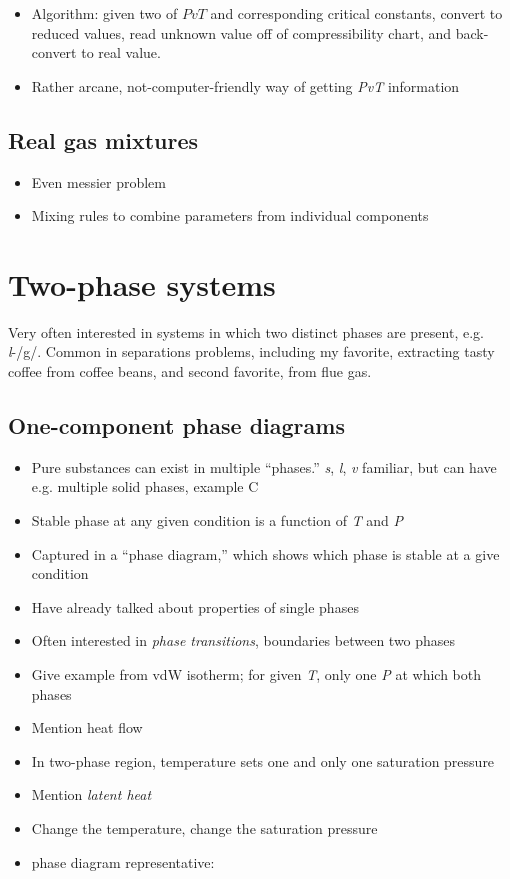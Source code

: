 \documentclass[11pt]{article}
\begin{document}
\begin{itemize}
\item Algorithm: given two of \(PvT\) and corresponding critical constants, convert to reduced values, read unknown value off of compressibility chart, and back-convert to real value.
\item Rather arcane, not-computer-friendly way of getting \emph{PvT} information
\end{itemize}

\subsection{Real gas mixtures}
\label{sec-7-5}
\begin{itemize}
\item Even messier problem
\item Mixing rules to combine parameters from individual components
\end{itemize}
\newpage

\section{Two-phase systems}
\label{sec-8}
Very often interested in systems in which two distinct phases are present, e.g. \emph{l}-/g/.  Common in separations problems, including my favorite, extracting tasty coffee from coffee beans, and second favorite,  from flue gas.

\subsection{One-component phase diagrams}
\label{sec-8-1}
\begin{itemize}
\item Pure substances can exist in multiple ``phases.''  \emph{s}, \emph{l}, \emph{v} familiar, but can have e.g. multiple solid phases, example C
\item Stable phase at any given condition is a function of \emph{T} and \emph{P}
\item Captured in a ``phase diagram,'' which shows which phase is stable at a give condition
\item Have already talked about properties of single phases
\item Often interested in \emph{phase transitions}, boundaries between two phases
\item Give example from vdW isotherm; for given \emph{T}, only one \emph{P} at which both phases
\item Mention heat flow
\item In two-phase region, temperature sets one and only one saturation pressure
\item Mention \emph{latent heat}
\item Change the temperature, change the saturation pressure

\item {} phase diagram representative:
\end{itemize}
\end{document}
